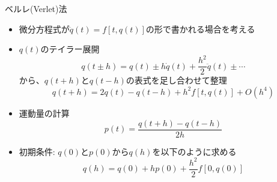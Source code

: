 \begin{frame}[t,fragile]{ベルレ(Verlet)法}
  \begin{itemize}
  \item 微分方程式が$\ddot{q}(t) = f[t,q(t)]$の形で書かれる場合を考える
  \item $q(t)$のテイラー展開
    \[
    q(t \pm h) = q(t) \pm h \dot{q}(t) + \frac{h^2}{2} \ddot{q}(t) \pm \cdots
    \]
    から、$q(t + h)$と$q(t - h)$の表式を足し合わせて整理
    \[
    q(t+h) = 2q(t) - q(t-h)+h^2 f[t,q(t)] + O(h^4)
    \]
  \item 運動量の計算
    \[
    p(t) = \frac{q(t+h) - q(t-h)}{2h}
    \]
  \item 初期条件: $q(0)$と$p(0)$から$q(h)$を以下のように求める
    \[
    q(h) = q(0) + h p(0) + \frac{h^2}{2} f[0, q(0)]
    \]
  \end{itemize}
\end{frame}
